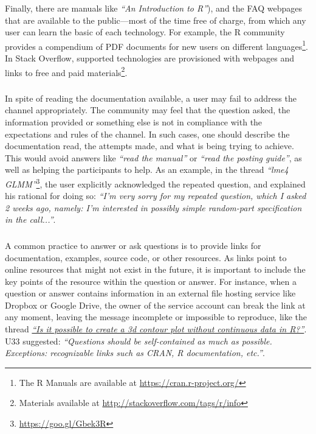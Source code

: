     Finally, there are manuals like \textit{``An Introduction to R''}), and the FAQ webpages that are available to the public---most of the time free of charge,
    from which any user can learn the basic of each technology.
    For example, the R community provides a compendium of PDF documents for new users on different languages\footnote{The R Manuals are available at \url{https://cran.r-project.org/}}.
    In Stack Overflow, supported technologies are provisioned with webpages and links to free and paid materials\footnote{Materials available at \url{http://stackoverflow.com/tags/r/info}}.



\subsubsection{\recc}

    In spite of reading the documentation available, a user may fail to address the channel appropriately.
    The community may feel that the question asked, the information provided or something else is not in compliance with the expectations and rules of the channel.
    In such cases, one should describe the documentation read, the attempts made, and what is being trying to achieve.
    This would avoid answers like \textit{``read the manual''} or \textit{``read the posting guide''}, as well as helping the participants to help.
    As an example, in the thread \textit{``lme4 GLMM''}\footnote{\url{https://goo.gl/Gbek3R}}, the user explicitly acknowledged the repeated question, and
    explained his rational for doing so: \textit{``I'm very sorry for my repeated question, which I asked 2 weeks ago, namely: I'm interested in possibly simple random-part specification in the call...''}.


\subsubsection{\recd}

    A common practice to answer or ask questions is to provide links for documentation, examples, source code, or other resources.
    As links point to online resources that might not exist in the future, it is important to include the key points of the resource within the question or answer.
    For instance, when a question or answer contains information in an external file hosting service like Dropbox or Google Drive, the owner of the service account can break the link at any moment, leaving the message incomplete or impossible to reproduce, like the thread \textit{\href{http://goo.gl/5nanFU}{``Is it possible to create a 3d contour plot without continuous data in R?''}}.
    U33 suggested: \textit{``Questions should be self-contained as much as possible. Exceptions: recognizable links such as CRAN, R documentation, etc.''}.

